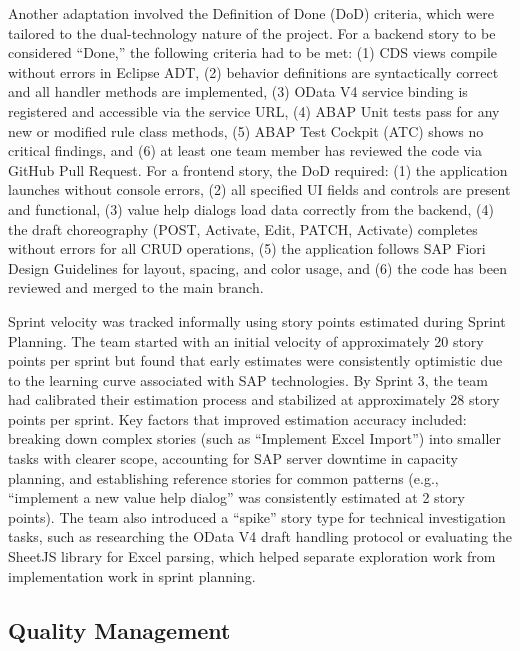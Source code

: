 \documentclass[12pt,a4paper]{report}
\begin{document}
Another adaptation involved the Definition of Done (DoD) criteria, which were tailored to the dual-technology nature of the project. For a backend story to be considered ``Done,'' the following criteria had to be met: (1) CDS views compile without errors in Eclipse ADT, (2) behavior definitions are syntactically correct and all handler methods are implemented, (3) OData V4 service binding is registered and accessible via the service URL, (4) ABAP Unit tests pass for any new or modified rule class methods, (5) ABAP Test Cockpit (ATC) shows no critical findings, and (6) at least one team member has reviewed the code via GitHub Pull Request. For a frontend story, the DoD required: (1) the application launches without console errors, (2) all specified UI fields and controls are present and functional, (3) value help dialogs load data correctly from the backend, (4) the draft choreography (POST, Activate, Edit, PATCH, Activate) completes without errors for all CRUD operations, (5) the application follows SAP Fiori Design Guidelines for layout, spacing, and color usage, and (6) the code has been reviewed and merged to the main branch.

Sprint velocity was tracked informally using story points estimated during Sprint Planning. The team started with an initial velocity of approximately 20 story points per sprint but found that early estimates were consistently optimistic due to the learning curve associated with SAP technologies. By Sprint 3, the team had calibrated their estimation process and stabilized at approximately 28 story points per sprint. Key factors that improved estimation accuracy included: breaking down complex stories (such as ``Implement Excel Import'') into smaller tasks with clearer scope, accounting for SAP server downtime in capacity planning, and establishing reference stories for common patterns (e.g., ``implement a new value help dialog'' was consistently estimated at 2 story points). The team also introduced a ``spike'' story type for technical investigation tasks, such as researching the OData V4 draft handling protocol or evaluating the SheetJS library for Excel parsing, which helped separate exploration work from implementation work in sprint planning.

\subsection{Quality Management}
\end{document}
